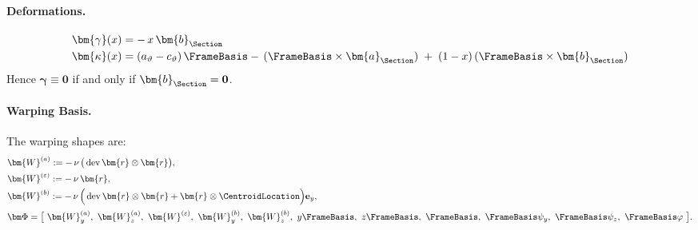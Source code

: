 \paragraph{Deformations.}

\begin{equation*}
\begin{aligned}
\bm{\gamma}(x)&= -\,x\,\bm{b}_{\Section}\\
\bm{\kappa}(x)&= (a_\vartheta-c_\vartheta)\,\FrameBasis
-\,(\FrameBasis\times\bm{a}_{\Section})\;+\;(1-x)\,(\FrameBasis\times\bm{b}_{\Section})
\end{aligned}
\end{equation*}
Hence \(\bm{\gamma}\equiv\mathbf{0}\) if and only if \(\bm{b}_{\Section}=\mathbf{0}\).

\paragraph{Warping Basis.}
The warping shapes are:
\begin{align*}
&\bm{W}^{(a)}:=-\,\nu\,\big(\operatorname{dev}\bm{r}\otimes\bm{r}\big),\\
&\bm{W}^{(\varepsilon)}:=-\,\nu\,\bm{r},\\
&\bm{W}^{(b)}:=-\,\nu\,\Big(\operatorname{dev}\bm{r}\otimes\bm{r}+\bm{r}\otimes\CentroidLocation\Big)\mathbf{e}_y,\\[2pt]
&\bm\Phi=\big[\ \bm{W}^{(a)}_y,\ \bm{W}^{(a)}_z,
              \ \bm{W}^{(\varepsilon)},
              \ \bm{W}^{(b)}_y,\ \bm{W}^{(b)}_z,
              \ y\FrameBasis,\ z\FrameBasis,
              \ \FrameBasis,
              \ \FrameBasis\psi_y,
              \ \FrameBasis\psi_z,
              \ \FrameBasis\varphi
              \ \big].
\end{align*}

